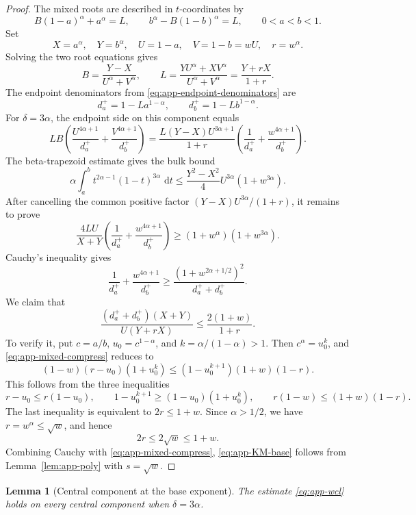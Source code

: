 \documentclass[pdflatex,sn-mathphys-num]{sn-jnl}
\numberwithin{equation}{section}
\theoremstyle{thmstyleone}
\newtheorem{lemma}[theorem]{Lemma}
\theoremstyle{thmstylethree}
\newcommand{\1}{\mathbf{1}}
\newcommand{\dd}{\,\mathrm{d}}
\begin{document}
\begin{proof}
The mixed roots are described in $t$-coordinates by
\[
 B(1-a)^\alpha+a^\alpha=L,
 \qquad
 b^\alpha-B(1-b)^\alpha=L,
 \qquad 0<a<b<1.
\]
Set
\[
 X=a^\alpha,
 \quad Y=b^\alpha,
 \quad U=1-a,
 \quad V=1-b=wU,
 \quad r=w^\alpha.
\]
Solving the two root equations gives
\begin{equation}\label{eq:app-mixed-BL}
 B=\frac{Y-X}{U^\alpha+V^\alpha},
 \qquad
 L=\frac{YU^\alpha+XV^\alpha}{U^\alpha+V^\alpha}=\frac{Y+rX}{1+r}.
\end{equation}
The endpoint denominators from \eqref{eq:app-endpoint-denominators} are
\[
 d_a^+=1-La^{1-\alpha},
 \qquad d_b^+=1-Lb^{1-\alpha}.
\]
For $\delta=3\alpha$, the endpoint side on this component equals
\[
 LB\left(\frac{U^{4\alpha+1}}{d_a^+}
 +\frac{V^{4\alpha+1}}{d_b^+}\right)
 =\frac{L(Y-X)U^{3\alpha+1}}{1+r}
 \left(\frac1{d_a^+}+\frac{w^{4\alpha+1}}{d_b^+}\right).
\]
The beta-trapezoid estimate gives the bulk bound
\[
 \alpha\int_a^b t^{2\alpha-1}(1-t)^{3\alpha}\,\dd t
 \le
 \frac{Y^2-X^2}{4}U^{3\alpha}(1+w^{3\alpha}).
\]
After cancelling the common positive factor $(Y-X)U^{3\alpha}/(1+r)$, it remains to prove
\begin{equation}\label{eq:app-KM-base}
 \frac{4LU}{X+Y}\left(\frac1{d_a^+}+\frac{w^{4\alpha+1}}{d_b^+}\right)
 \ge(1+w^\alpha)(1+w^{3\alpha}).
\end{equation}
Cauchy's inequality gives
\[
 \frac1{d_a^+}+\frac{w^{4\alpha+1}}{d_b^+}
 \ge\frac{(1+w^{2\alpha+1/2})^2}{d_a^++d_b^+}.
\]
We claim that
\begin{equation}\label{eq:app-mixed-compress}
 \frac{(d_a^++d_b^+)(X+Y)}{U(Y+rX)}\le\frac{2(1+w)}{1+r}.
\end{equation}
To verify it, put $c=a/b$, $u_0=c^{1-\alpha}$, and $k=\alpha/(1-\alpha)>1$. Then $c^\alpha=u_0^k$, and \eqref{eq:app-mixed-compress} reduces to
\[
 (1-w)(r-u_0)(1+u_0^k)
 \le (1-u_0^{k+1})(1+w)(1-r).
\]
This follows from the three inequalities
\[
 r-u_0\le r(1-u_0),
 \qquad
 1-u_0^{k+1}\ge(1-u_0)(1+u_0^k),
 \qquad
 r(1-w)\le(1+w)(1-r).
\]
The last inequality is equivalent to $2r\le1+w$. Since $\alpha>1/2$, we have $r=w^\alpha\le\sqrt w$, and hence
\[
 2r\le2\sqrt w\le1+w.
\]
Combining Cauchy with \eqref{eq:app-mixed-compress}, \eqref{eq:app-KM-base} follows from Lemma~\ref{lem:app-poly} with $s=\sqrt w$.
\end{proof}

\begin{lemma}[Central component at the base exponent]\label{lem:app-central-component}
The estimate \eqref{eq:app-wcl} holds on every central component when $\delta=3\alpha$.
\end{lemma}
\end{document}
